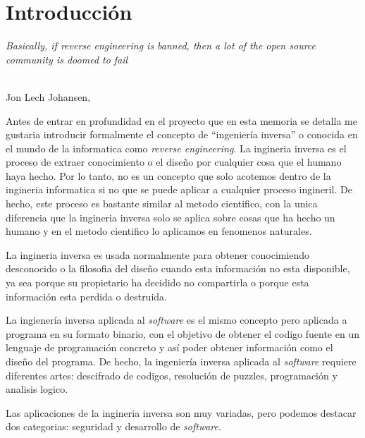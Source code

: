\chapter{Introducción}
\label{cap:introducion}
\setcounter{page}{1}

\begin{flushright}
    \begin{minipage}[]{10cm}
        \emph{Basically, if reverse engineering is banned, then a lot of the open source community is doomed to fail}\\
    \end{minipage}\\

    Jon Lech Johansen, \textit{}\\
\end{flushright}

\vspace{1cm}

Antes de entrar en profundidad en el proyecto que en esta memoria se detalla me gustaria introducir formalmente el concepto de ``ingeniería inversa'' o conocida en el mundo de la
informatica como \textit{reverse engineering}. La ingineria inversa es el proceso de extraer conocimiento o el diseño por cualquier cosa que el humano haya hecho. Por lo tanto,
no es un concepto que solo acotemos dentro de la ingineria informatica si no que se puede aplicar a cualquier proceso ingineril. De hecho, este proceso es bastante similar al
metodo cientifico, con la unica diferencia que la ingineria inversa solo se aplica sobre cosas que ha hecho un humano y en el metodo cientifico lo aplicamos en fenomenos
naturales.

La ingineria inversa es usada normalmente para obtener conocimiendo desconocido o la filosofia del diseño cuando esta información no esta disponible, ya sea porque su propietario
ha decidido no compartirla o porque esta información esta perdida o destruida. \cite{alma991003132729706711}

La ingienería inversa aplicada al \textit{software} es el mismo concepto pero aplicada a programa en su formato binario, con el objetivo de obtener el codigo fuente en un lenguaje
de programación concreto y así poder obtener información como el diseño del programa. De hecho, la ingeniería inversa aplicada al \textit{software} requiere diferentes artes:
descifrado de codigos, resolución de puzzles, programación y analisis logico.

Las aplicaciones de la ingineria inversa son muy variadas, pero podemos destacar dos categorias: seguridad y desarrollo de \textit{software}.

